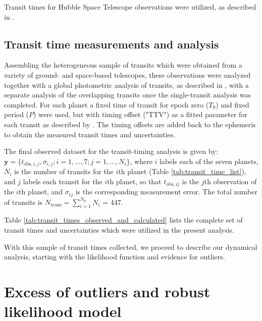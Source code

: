 \documentclass[twocolumn]{aastex63}
\begin{document}
Transit times for Hubble Space Telescope observations were utilized, as described in \citet{Grimm2018,deWit2016,deWit2018,Wakeford2018}.

\subsection{Transit time measurements and analysis}\label{sec:transit_time_measurements}


Assembling the heterogeneous sample of transits which were obtained from a variety of ground- and space-based telescopes,  these observations were analyzed together
with a global photometric analysis of transits, as described in 
\citet{Ducrot2020}, with a separate analysis of the overlapping transits once the single-transit analysis was completed.
For each planet a fixed time of transit for epoch zero ($T_{0}$) and fixed period ($P$) were used, but with timing offset ("TTV") as a fitted parameter for each transit as described by \cite{Ducrot2020}.  The timing offsets are added back
to the ephemeris to obtain the measured transit times and uncertainties.

The final observed dataset for the transit-timing analysis
is given by: $\mathbf{y} = \{t_{\mathrm{obs},i,j},\sigma_{i,j}; i=1,...,7; j = 1,...,N_i\}$, where $i$ labels each of the seven planets, $N_i$ is
the number of transits for the $i$th planet (Table \ref{tab:transit_time_list}),
and $j$ labels each transit for the $i$th planet, so that
$t_{\mathrm{obs},ij}$ is the $j$th observation of the $i$th planet, and
$\sigma_{ij}$ is the corresponding measurement error.  The total number of transits is $N_\mathrm{trans} = \sum_{i=1}^{N_p} N_i$ = 447.

Table \ref{tab:transit_times_observed_and_calculated} lists the complete set
of transit times and uncertainties which were utilized in the present analysis.

With this sample of transit times collected, we proceed to describe our
dynamical analysis, starting with the likelihood function and evidence for outliers.

\section{Excess of outliers and robust likelihood model} \label{sec:outliers}
\end{document}
